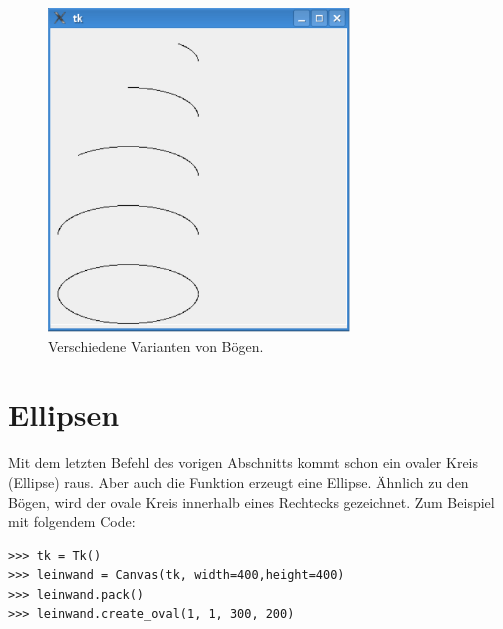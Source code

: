 \begin{figure}
\begin{center}
\includegraphics[width=80mm]{images/figure37}
\end{center}
\caption{Verschiedene Varianten von Bögen.}\label{fig37}
\end{figure}

\section{Ellipsen}

Mit dem letzten Befehl des vorigen Abschnitts kommt schon ein ovaler Kreis (Ellipse) raus. Aber auch die Funktion  erzeugt eine Ellipse. Ähnlich zu den Bögen, wird der ovale Kreis innerhalb eines Rechtecks gezeichnet. Zum Beispiel mit folgendem Code:

\begin{Verbatim}[frame=single]
>>> tk = Tk()
>>> leinwand = Canvas(tk, width=400,height=400)
>>> leinwand.pack()
>>> leinwand.create_oval(1, 1, 300, 200)
\end{Verbatim}

